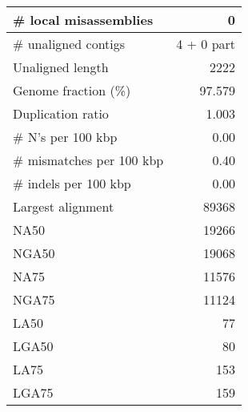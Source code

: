 \documentclass[12pt,a4paper]{article}
\begin{document}
\begin{table}[ht]
\begin{center}
\begin{tabular}{|l*{1}{|r}|}
\# local misassemblies & 0 \\ \hline
\# unaligned contigs & 4 + 0 part \\ \hline
Unaligned length & 2222 \\ \hline
Genome fraction (\%) & 97.579 \\ \hline
Duplication ratio & 1.003 \\ \hline
\# N's per 100 kbp & 0.00 \\ \hline
\# mismatches per 100 kbp & 0.40 \\ \hline
\# indels per 100 kbp & 0.00 \\ \hline
Largest alignment & 89368 \\ \hline
NA50 & 19266 \\ \hline
NGA50 & 19068 \\ \hline
NA75 & 11576 \\ \hline
NGA75 & 11124 \\ \hline
LA50 & 77 \\ \hline
LGA50 & 80 \\ \hline
LA75 & 153 \\ \hline
LGA75 & 159 \\ \hline
\end{tabular}
\end{center}
\end{table}
\end{document}
